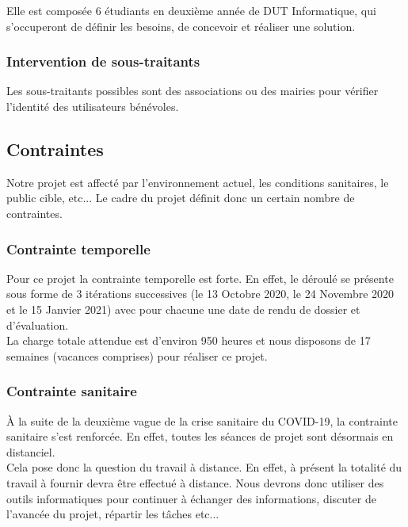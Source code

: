 \documentclass[a4paper,11pt]{article}
\begin{document}
Elle est composée 6 étudiants en deuxième année de DUT Informatique, qui s’occuperont de définir les
besoins, de concevoir et réaliser une solution.\\

\subsubsection{Intervention de sous-traitants}

Les sous-traitants possibles sont des associations ou des mairies pour vérifier l’identité des utilisateurs
bénévoles.\\

\subsection{Contraintes}

Notre projet est affecté par l’environnement actuel, les conditions sanitaires, le public cible, etc...
Le cadre du projet définit donc un certain nombre de contraintes.

\subsubsection{Contrainte temporelle}

Pour ce projet la contrainte temporelle est forte. En effet, le déroulé se présente sous forme de
3 itérations successives (le 13 Octobre 2020, le 24 Novembre 2020 et le 15 Janvier 2021) avec pour
chacune une date de rendu de dossier et d’évaluation.\\

La charge totale attendue est d’environ 950 heures et nous disposons de 17 semaines (vacances
comprises) pour réaliser ce projet.\\

\subsubsection{Contrainte sanitaire}

À la suite de la deuxième vague de la crise sanitaire du COVID-19, la contrainte sanitaire s'est renforcée.
En effet, toutes les séances de projet sont désormais en distanciel.\\

Cela pose donc la question du travail à distance. En effet, à présent la totalité du travail à fournir devra
être effectué à distance. Nous devrons donc utiliser des outils informatiques pour continuer à échanger des
informations, discuter de l’avancée du projet, répartir les tâches etc...\\
\end{document}

